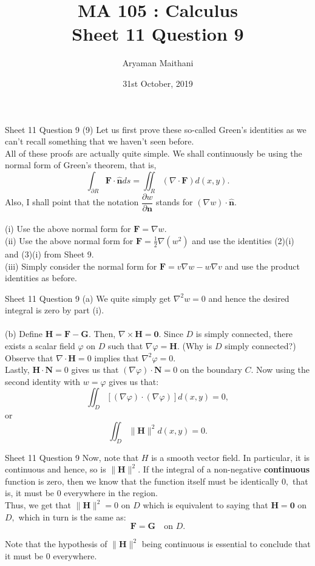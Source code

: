 \documentclass[handout, aspectratio=169]{beamer}
\title{MA 105 : Calculus\\ Sheet 11 Question 9}  %
\author{Aryaman Maithani}
\date[31-10-2019]{31st October, 2019}               %
\institute[IITB]{IIT Bombay}
\begin{document}
\begin{frame}{Sheet 11 Question 9}                            %
	(9) Let us first prove these so-called Green's identities as we can't recall something that we haven't seen before.\\
	All of these proofs are actually quite simple. We shall continuously be using the normal form of Green's theorem, that is,
	\[\int_{\partial R}\mathbf{F}\cdot\mathbf{\hat{n}}ds = \iint_R(\nabla\cdot\mathbf{F})d(x, y).\]
	Also, I shall point that the notation $\dfrac{\partial w}{\partial \mathbf{n}}$ stands for $(\nabla w)\cdot\mathbf{\hat{n}}.$\\~\\
	(i)	Use the above normal form for $\mathbf{F} = \nabla w.$\\
	(ii) Use the above normal form for $\mathbf{F} = \frac{1}{2}\nabla (w^2)$ and use the identities (2)(i) and (3)(i) from Sheet 9.\\
	(iii) Simply consider the normal form for $\mathbf{F} = v\nabla w - w\nabla v$ and use the product identities as before.
\end{frame}
\begin{frame}{Sheet 11 Question 9} 
	(a) We quite simply get $\nabla^2 w = 0$ and hence the desired integral is zero by part (i).\\~\\
	(b) Define $\mathbf{H} = \mathbf{F} - \mathbf{G}.$ Then, $\nabla\times\mathbf{H}=\mathbf{0}.$ Since $D$ is simply connected, there exists a scalar field $\varphi$ on $D$ such that $\nabla \varphi = \mathbf{H}.$ \hfill (Why is $D$ simply connected?)\\
	Observe that $\nabla\cdot\mathbf{H} = 0$ implies that $\nabla^2\varphi = 0.$\\
	Lastly, $\mathbf{H}\cdot\mathbf{N} = 0$ gives us that $(\nabla\varphi)\cdot\mathbf{N} = 0$ on the boundary $C.$ Now using the second identity with $w = \varphi$ gives us that:
	\[\iint_D [(\nabla \varphi)\cdot(\nabla \varphi)]d(x, y) = 0,\]
	or 
	\[\iint_D \|\mathbf{H}\|^2d(x, y) = 0.\]
\end{frame}
\begin{frame}{Sheet 11 Question 9} 
	Now, note that $H$ is a smooth vector field. In particular, it is continuous and hence, so is $\|\mathbf{H}\|^2.$ If the integral of a non-negative \textbf{continuous} function is zero, then we know that the function itself must be identically $0,$ that is, it must be $0$ everywhere in the region.\\
	Thus, we get that $\|\mathbf{H}\|^2 = 0$ on $D$ which is equivalent to saying that $\mathbf{H} = \mathbf{0}$ on $D,$ which in turn is the same as:
	\[\mathbf{F} = \mathbf{G} \quad \text{on } D.\]
	\vspace{1 cm}
	
	Note that the hypothesis of $\|\mathbf{H}\|^2$ being continuous is essential to conclude that it must be $0$ everywhere.
\end{frame}
\end{document}
